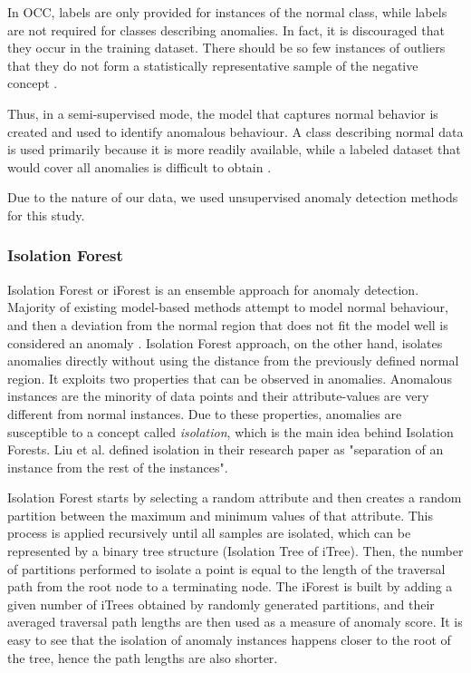In OCC, labels are only provided for instances of the normal class, while labels are not required for classes describing anomalies. In fact, it is discouraged that they occur in the training dataset. There should be so few instances of outliers that they do not form a statistically representative sample of the negative concept \cite{khan_madden_2014}.
 
Thus, in a semi-supervised mode, the model that captures normal behavior is created and used to identify anomalous behaviour. A class describing normal data is used primarily because it is more readily available, while a labeled dataset that would cover all anomalies is difficult to obtain \cite{anomalyDetectionSurvey}.
 
Due to the nature of our data, we used unsupervised anomaly detection methods for this study.

\subsubsection{Isolation Forest}
\label{section:lrIsolationForest}
Isolation Forest or iForest \cite{liu2012isolation} is an ensemble approach for anomaly detection. Majority of existing model-based methods attempt to model normal behaviour, and then a deviation from the normal region that does not fit the model well is considered an anomaly \cite{introToDataMining2005}. Isolation Forest approach, on the other hand, isolates anomalies directly without using the distance from the previously defined normal region. It exploits two properties that can be observed in anomalies. Anomalous instances are the minority of data points and their attribute-values are very different from normal instances. Due to these properties, anomalies are susceptible to a concept called \textit{isolation}, which is the main idea behind Isolation Forests. Liu et al. \cite{liu2012isolation} defined isolation in their research paper as "separation of an instance from the rest of the instances".

Isolation Forest starts by selecting a random attribute and then creates a random partition between the maximum and minimum values of that attribute. This process is applied recursively until all samples are isolated, which can be represented by a binary tree structure (Isolation Tree of iTree). Then, the number of partitions performed to isolate a point is equal to the length of the traversal path from the root node to a terminating node. The iForest is built by adding a given number of iTrees obtained by randomly generated partitions, and their averaged traversal path lengths are then used as a measure of anomaly score. It is easy to see that the isolation of anomaly instances happens closer to the root of the tree, hence the path lengths are also shorter.

